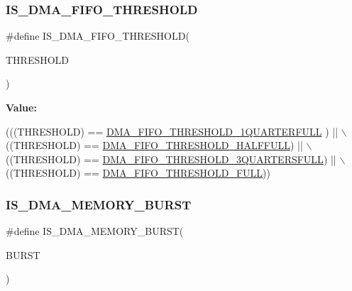 \subsubsection{\texorpdfstring{I\+S\+\_\+\+D\+M\+A\+\_\+\+F\+I\+F\+O\+\_\+\+T\+H\+R\+E\+S\+H\+O\+LD}{IS\_DMA\_FIFO\_THRESHOLD}}
{\footnotesize\ttfamily \#define I\+S\+\_\+\+D\+M\+A\+\_\+\+F\+I\+F\+O\+\_\+\+T\+H\+R\+E\+S\+H\+O\+LD(\begin{DoxyParamCaption}\item[{}]{T\+H\+R\+E\+S\+H\+O\+LD }\end{DoxyParamCaption})}

{\bfseries Value\+:}
\begin{DoxyCode}
(((THRESHOLD) == \hyperlink{group___d_m_a___f_i_f_o__threshold__level_ga4debbd5733190b61b2115613d4b3658b}{DMA\_FIFO\_THRESHOLD\_1QUARTERFULL} ) || \(\backslash\)
                                          ((THRESHOLD) == 
      \hyperlink{group___d_m_a___f_i_f_o__threshold__level_gad2b071aa3a3bfc936017f12fb956c56f}{DMA\_FIFO\_THRESHOLD\_HALFFULL})      || \(\backslash\)
                                          ((THRESHOLD) == 
      \hyperlink{group___d_m_a___f_i_f_o__threshold__level_gae1e4ba12bae8440421e6672795d71223}{DMA\_FIFO\_THRESHOLD\_3QUARTERSFULL}) || \(\backslash\)
                                          ((THRESHOLD) == 
      \hyperlink{group___d_m_a___f_i_f_o__threshold__level_ga5de463bb24dc12fe7bbb300e1e4493f7}{DMA\_FIFO\_THRESHOLD\_FULL}))
\end{DoxyCode}
\mbox{\label{group___d_m_a___private___macros_ga921ebf06447dc036180fff50b7e4846a}} 
\subsubsection{\texorpdfstring{I\+S\+\_\+\+D\+M\+A\+\_\+\+M\+E\+M\+O\+R\+Y\+\_\+\+B\+U\+R\+ST}{IS\_DMA\_MEMORY\_BURST}}
{\footnotesize\ttfamily \#define I\+S\+\_\+\+D\+M\+A\+\_\+\+M\+E\+M\+O\+R\+Y\+\_\+\+B\+U\+R\+ST(\begin{DoxyParamCaption}\item[{}]{B\+U\+R\+ST }\end{DoxyParamCaption})}

